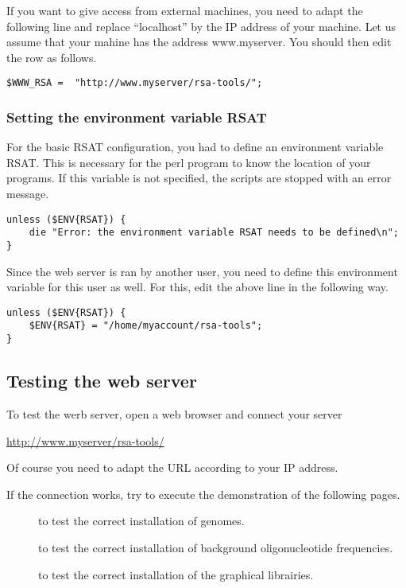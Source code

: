 \documentclass{article}
\begin{document}
If you want to give access from external machines, you need to adapt
the following line and replace ``localhost'' by the IP address of your
machine. Let us assume that your mahine has the address
www.myserver. You should then edit the row as follows.

\begin{verbatim}
$WWW_RSA = 	"http://www.myserver/rsa-tools/";
\end{verbatim}

\subsubsection{Setting the environment variable RSAT}

For the basic RSAT configuration, you had to define an environment
variable RSAT. This is necessary for the perl program to know the
location of your programs. If this variable is not specified, the
scripts are stopped with an error message.

\begin{verbatim}
unless ($ENV{RSAT}) {
    die "Error: the environment variable RSAT needs to be defined\n";
}
\end{verbatim}

Since the web server is ran by another user, you need to define this
environment variable for this user as well. For this, edit the
above line in the following way.

\begin{verbatim}
unless ($ENV{RSAT}) {
    $ENV{RSAT} = "/home/myaccount/rsa-tools";
}
\end{verbatim}


\subsection{Testing the web server}

To test the werb server, open a web browser and connect your \RSAT server

\url{http://www.myserver/rsa-tools/} 

Of course you  need to adapt the URL according to your IP address.

If the connection works, try to execute the demonstration of the
following pages.

\begin{description}
\item[] to test the correct installation of genomes. 

\item[] to test the correct installation of
background oligonucleotide frequencies.

\item[] to test the correct installation of the
graphical librairies.

\end{description}
\end{document}
